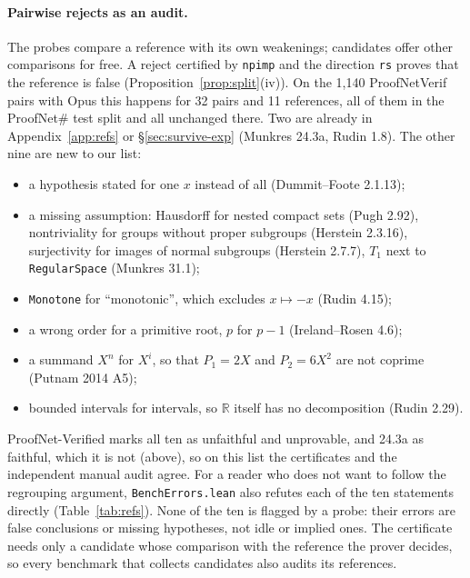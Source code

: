 \documentclass[10pt]{article}
\theoremstyle{definition}
\begin{document}
\paragraph{Pairwise rejects as an audit.} The probes compare a reference with its own weakenings;
candidates offer other comparisons for free. A reject certified by \texttt{npimp} and the
direction \texttt{rs} proves that the reference is false (Proposition~\ref{prop:split}(iv)). On the
1,140 ProofNetVerif pairs with Opus this happens for 32 pairs and 11 references, all of them in the
ProofNet\# test split and all unchanged there. Two are already in Appendix~\ref{app:refs} or
\S\ref{sec:survive-exp} (Munkres 24.3a, Rudin 1.8). The other nine are new to our list:
\begin{itemize}
\item a hypothesis stated for one $x$ instead of all (Dummit--Foote 2.1.13);
\item a missing assumption: Hausdorff for nested compact sets (Pugh 2.92), nontriviality for
groups without proper subgroups (Herstein 2.3.16), surjectivity for images of normal subgroups
(Herstein 2.7.7), $T_1$ next to \texttt{RegularSpace} (Munkres 31.1);
\item \texttt{Monotone} for ``monotonic'', which excludes $x\mapsto -x$ (Rudin 4.15);
\item a wrong order for a primitive root, $p$ for $p-1$ (Ireland--Rosen 4.6);
\item a summand $X^n$ for $X^i$, so that $P_1=2X$ and $P_2=6X^2$ are not coprime
(Putnam 2014 A5);
\item bounded intervals for intervals, so $\mathbb R$ itself has no decomposition (Rudin 2.29).
\end{itemize}
ProofNet-Verified marks all ten as unfaithful and unprovable, and 24.3a as faithful, which it is
not (above), so on this list the certificates and the independent manual audit agree. For a
reader who does not want to follow the regrouping argument, \texttt{BenchErrors.lean} also
refutes each of the ten statements directly (Table~\ref{tab:refs}). None of
the ten is flagged by a probe: their errors are false conclusions or missing hypotheses, not
idle or implied ones. The certificate needs only a candidate whose comparison with the reference
the prover decides, so every benchmark that collects candidates also audits its references.
\end{document}
